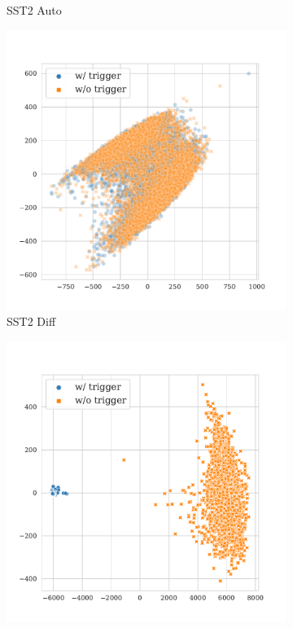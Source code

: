 \begin{figure}[!ht]
\begin{subfigure}{.16\textwidth}
  \caption{\tiny{SST2 Auto}}
  \label{fig:sst2_auto_k16_embed_extra}
\end{subfigure}%
\begin{subfigure}{.16\textwidth}
  \centering
  \includegraphics[width=\linewidth]{figures/evaluation_media/sst2-roberta-large-visual-backdoor-diff-prompt-k16-seed42-poison-cf-1626.pdf}
  \caption{\tiny{SST2 Diff}}
  \label{fig:sst2_diff_k16_embed_extra}
\end{subfigure}%
\begin{subfigure}{.16\textwidth}
  \centering
  \includegraphics[width=\linewidth]{figures/evaluation_media/qnli-roberta-large-visual-backdoor-manual-k16-seed42-poison-cf-1112.pdf}

\end{subfigure}
\end{figure}
